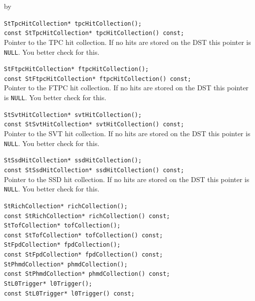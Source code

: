 \documentclass[twoside]{article}
\newcommand{\entrylabel}[1]{\mbox{\textbf{{#1}}}\hfil}%
\newenvironment{entry}
{\begin{list}{}%
    {\renewcommand{\makelabel}{\entrylabel}%
     \setlength{\labelwidth}{90pt}%
     \setlength{\leftmargin}{\labelwidth}
     \advance\leftmargin by \labelsep%
      }%
    }%
  {\end{list}}
\newcommand{\Entrylabel}[1]%
{\raisebox{0pt}[1ex][0pt]{\makebox[\labelwidth][l]%
    {\parbox[t]{\labelwidth}{\hspace{0pt}\textbf{{#1}}}}}}
\newenvironment{Entry}%
{\renewcommand{\entrylabel}{\Entrylabel}\begin{entry}}%
  {\end{entry}}
\begin{document}
\begin{Entry}
    \verb+StTpcHitCollection* tpcHitCollection();+\\
    \verb+const StTpcHitCollection* tpcHitCollection() const;+\\
    Pointer to the TPC hit collection. If no hits are stored on the
    DST this pointer is \texttt{NULL}. You better check for this.
    
    \verb+StFtpcHitCollection* ftpcHitCollection();+\\
    \verb+const StFtpcHitCollection* ftpcHitCollection() const;+\\
    Pointer to the FTPC hit collection. If no hits are stored on the
    DST this pointer is \texttt{NULL}. You better check for this.

    \verb+StSvtHitCollection* svtHitCollection();+\\
    \verb+const StSvtHitCollection* svtHitCollection() const;+\\
    Pointer to the SVT hit collection. If no hits are stored on the
    DST this pointer is \texttt{NULL}. You better check for this.    

    \verb+StSsdHitCollection* ssdHitCollection();+\\
    \verb+const StSsdHitCollection* ssdHitCollection() const;+\\
    Pointer to the SSD hit collection. If no hits are stored on the
    DST this pointer is \texttt{NULL}. You better check for this.   

    \verb+StRichCollection* richCollection();+\\
    \verb+const StRichCollection* richCollection() const;+\\

    \verb+StTofCollection* tofCollection();+\\
    \verb+const StTofCollection* tofCollection() const;+\\

    \verb+StFpdCollection* fpdCollection();+\\
    \verb+const StFpdCollection* fpdCollection() const;+\\

    \verb+StPhmdCollection* phmdCollection();+\\
    \verb+const StPhmdCollection* phmdCollection() const;+\\

    \verb+StL0Trigger* l0Trigger();+\\
    \verb+const StL0Trigger* l0Trigger() const;+\\


\end{Entry}
\end{document}
